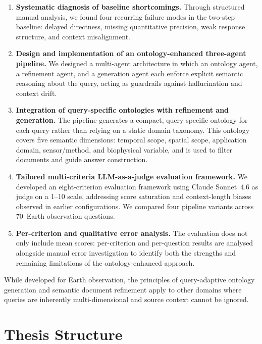 \begin{enumerate}
\item \textbf{Systematic diagnosis of baseline shortcomings.} Through structured manual analysis, we found four recurring failure modes in the two-step baseline: delayed directness, missing quantitative precision, weak response structure, and context misalignment.

\item \textbf{Design and implementation of an ontology-enhanced three-agent pipeline.} We designed a multi-agent architecture in which an ontology agent, a refinement agent, and a generation agent each enforce explicit semantic reasoning about the query, acting as guardrails against hallucination and context drift.

\item \textbf{Integration of query-specific ontologies with refinement and generation.} The pipeline generates a compact, query-specific ontology for each query rather than relying on a static domain taxonomy. This ontology covers five semantic dimensions: temporal scope, spatial scope, application domain, sensor/method, and biophysical variable, and is used to filter documents and guide answer construction.

\item \textbf{Tailored multi-criteria LLM-as-a-judge evaluation framework.} We developed an eight-criterion evaluation framework using Claude Sonnet~4.6 as judge on a 1--10 scale, addressing score saturation and context-length biases observed in earlier configurations. We compared four pipeline variants across 70~Earth observation questions.

\item \textbf{Per-criterion and qualitative error analysis.} The evaluation does not only include mean scores: per-criterion and per-question results are analysed alongside manual error investigation to identify both the strengths and remaining limitations of the ontology-enhanced approach.
\end{enumerate}

While developed for Earth observation, the principles of query-adaptive ontology generation and semantic document refinement apply to other domains where queries are inherently multi-dimensional and source context cannot be ignored.

\section{Thesis Structure}
\label{sec:structure}

